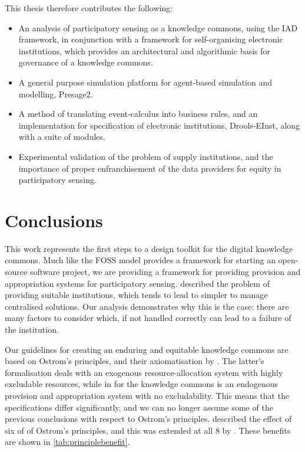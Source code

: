 This thesis therefore contributes the following:

\begin{itemize}
\item An analysis of participatory sensing as a knowledge commons, using the \ac{IAD} framework, in conjunction with a framework for self-organising electronic institutions, which provides an architectural and algorithmic basis for governance of a knowledge commons.
\item A general purpose simulation platform for agent-based simulation and modelling, Presage2.
\item A method of translating event-calculus into business rules, and an implementation for specification of electronic institutions, Drools-EInst, along with a suite of modules.
\item Experimental validation of the problem of supply institutions, and the importance of proper enfranchisement of the data providers for equity in participatory sensing.
\end{itemize}

\section{Conclusions}

This work represents the first steps to a design toolkit for the digital
knowledge commons. Much like the \ac{FOSS} model provides a framework for
starting an open-source software project, we are providing a framework for
providing provision and appropriation systems for participatory sensing.
\citet{Ostrom1990} described the problem of providing suitable institutions,
which tends to lead to simpler to manage centralised solutions. Our analysis
demonstrates why this is the case: there are many factors to consider which,
if not handled correctly can lead to a failure of the institution.

Our guidelines for creating an enduring and equitable knowledge commons are
based on Ostrom's principles, and their axiomatisation by \citet{Pitt2012b}.
The latter's formalisation deals with an exogenous resource-allocation system
with highly excludable resources, while in for the knowledge commons is an
endogenous provision and appropriation system with no excludability. This
means that the specifications differ significantly, and we can no longer
assume some of the previous conclusions with respect to Ostrom's principles.
\citet{Pitt2012b} described the effect of six of of Ostrom's principles, and this was extended at all 8 by \citet{Schaumeier2013}. These benefits are shown in \autoref{tab:principlebenefit}.

